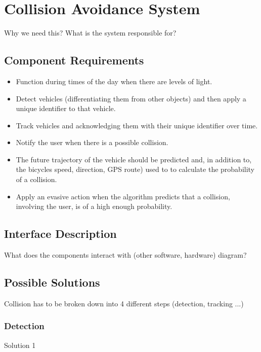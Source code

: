 \documentclass[]{report}
\begin{document}
\section{Collision Avoidance System}
Why we need this? What is the system responsible for?
\subsection{Component Requirements}
\begin{itemize}
  \item Function during times of the day when there are levels of light.
  \item Detect vehicles (differentiating them from other objects) and then apply a unique identifier to that vehicle.
  \item Track vehicles and acknowledging them with their unique identifier over time.
  \item Notify the user when there is a possible collision.
  \item The future trajectory of the vehicle should be predicted and, in addition to, the bicycles speed, direction, GPS route) used to to calculate the probability of a collision.
  \item Apply an evasive action when the algorithm predicts that a collision, involving the user, is of a high enough probability. 
\end{itemize}

\subsection{Interface Description} What does the components interact with (other software, hardware) diagram?

\subsection{Possible Solutions} Collision has to be broken down into 4 different steps (detection, tracking ...)

\subsubsection{Detection}

Solution 1

\paragraph {}
\end{document}
